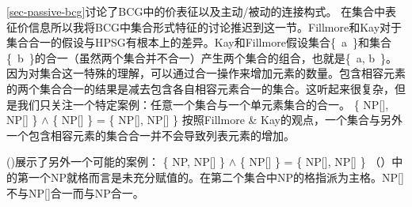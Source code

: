 \ref{sec-passive-bcg}讨论了BCG中的价表征以及主动/被动的连接构式。 在集合中表征价信息所以我将BCG中集合形式特征的讨论推迟到这一节。Fillmore和Kay对于集合合一的假设与HPSG有根本上的差异。Kay和Fillmore假设集合\{~a~\}和集合\mbox{\{ b \}}的合一（虽然两个集合并不合一）产生两个集合的组合，也就是\{~a, b~\}。因为对集合这一特殊的理解，可以通过合一操作来增加元素的数量。包含相容元素的两个集合合一的结果是减去包含各自相容元素合一的集合。这听起来很复杂，但是我们只关注一个特定案例：任意一个集合与一个单元素集合的合一。
\ea
\{ NP[], NP[] \} $\wedge$ \{ NP[] \} = \{ NP[], NP[] \}
\z
按照Fillmore \& Kay的观点，一个集合与另外一个包含相容元素的集合合一并不会导致列表元素的增加。

\noindent
()展示了另外一个可能的案例：
\ea
\{ NP, NP[] \} $\wedge$ \{ NP[] \} = \{ NP[], NP[] \}
\z
（）中的第一个NP就格而言是未充分赋值的。在第二个集合中NP的格指派为主格。NP[]不与NP[]合一而与NP合一。

